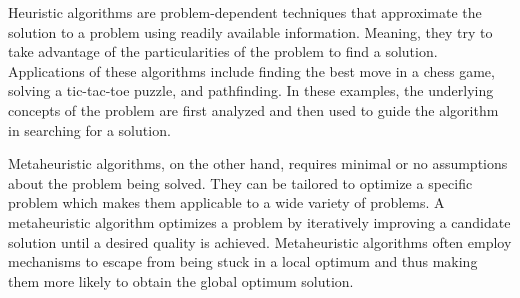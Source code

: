 Heuristic algorithms are problem-dependent techniques that approximate the solution to a problem using readily available information. Meaning, they try to take advantage of the particularities of the problem to find a solution. Applications of these algorithms include finding the best move in a chess game, solving a tic-tac-toe puzzle, and pathfinding. In these examples, the underlying concepts of the problem are first analyzed and then used to guide the algorithm in searching for a solution.

Metaheuristic algorithms, on the other hand, requires minimal or no assumptions about the problem being solved. They can be tailored to optimize a specific problem which makes them applicable to a wide variety of problems. A metaheuristic algorithm optimizes a problem by iteratively improving a candidate solution until a desired quality is achieved. Metaheuristic algorithms often employ mechanisms to escape from being stuck in a local optimum and thus making them more likely to obtain the global optimum solution.

